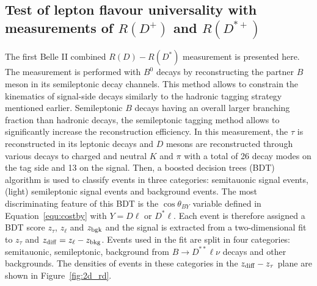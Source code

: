 \documentclass{moriond}
\def\costby{\cos\theta_{BY}}
\def\zdiff{z_{\rm diff}}
\begin{document}
\subsection{Test of lepton flavour universality with measurements of $R(D^+)$ and $R(D^{*+})$}
The first Belle II combined $R(D)-R(D^*)$ measurement is presented here. The measurement is performed with $B^0$ decays by reconstructing the partner $B$ meson in its semileptonic decay channels. This method allows to constrain the kinematics of signal-side decays similarly to the hadronic tagging strategy mentioned earlier. Semileptonic $B$ decays having an overall larger branching fraction than hadronic decays, the semileptonic tagging method allows to significantly increase the reconstruction efficiency. In this measurement, the $\tau$ is reconstructed in its leptonic decays and $D$ mesons are reconstructed through various decays to charged and neutral $K$ and $\pi$ with a total of 26 decay modes on the tag side and 13 on the signal. Then, a boosted decision trees (BDT) algorithm is used to classify events in three categories: semitauonic signal events, (light) semileptonic signal events and background events. The most discriminating feature of this BDT is the $\costby$ variable defined in Equation~\ref{equ:costby} with $Y=D\ell$ or $D^*\ell$. Each event is therefore assigned a BDT score $z_\tau$, $z_\ell$ and $z_{\rm bgk}$ and the signal is extracted from a two-dimensional fit to $z_\tau$ and $\zdiff = z_\ell - z_{\rm bkg}$. Events used in the fit are split in four categories: semitauonic, semileptonic, background from $B \to D^{**}\ell\nu$ decays and other backgrounds. The densities of events in these categories in the $\zdiff-z_\tau$ plane are shown in Figure~\ref{fig:2d_rd}.
\end{document}
